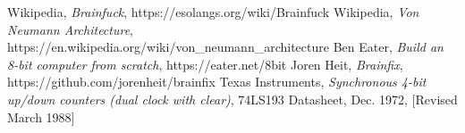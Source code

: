 \begin{thebibliography}{99} \label{resources}
 Wikipedia, \emph{Brainfuck}, https://esolangs.org/wiki/Brainfuck
 Wikipedia, \emph{Von Neumann Architecture},\\https://en.wikipedia.org/wiki/von\_neumann\_architecture
 Ben Eater, \emph{Build an 8-bit computer from scratch}, https://eater.net/8bit
 Joren Heit, \emph{Brainfix}, https://github.com/jorenheit/brainfix
 Texas Instruments, \emph{Synchronous 4-bit up/down counters (dual clock with clear)}, 74LS193 Datasheet, Dec. 1972, [Revised March 1988]
\end{thebibliography}

